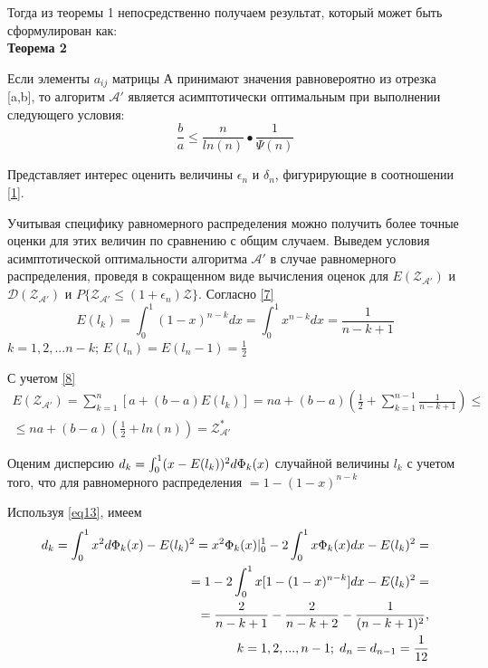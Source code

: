 \documentclass[a4paper, 14pt]{extarticle}
\numberwithin{equation}{section}
\begin{document}
Тогда из теоремы 1 непосредственно получаем результат, который может быть сформулирован как:\\

\textbf{Теорема 2}

Если элементы $a_{ij}$ матрицы А принимают значения равновероятно из отрезка [a,b], то алгоритм $\mathcal{A'}$ является асимптотически оптимальным при выполнении следующего условия:
\begin{equation}
\frac{b}{a} \leq \frac{n}{ln(n)}•\frac{1}{\Psi(n)}
\end{equation}

Представляет интерес оценить величины $\epsilon_n$ и $\delta_n$, фигурирующие в соотношении \eqref{1}.

Учитывая специфику равномерного распределения можно получить более точные оценки для этих величин по сравнению с общим случаем. Выведем условия асимптотической оптимальности алгоритма $\mathcal{A'}$ в случае равномерного распределения, проведя в сокращенном виде вычисления оценок для $E(\mathcal{Z_{A'}})$ и $\mathcal{D(Z_{A'})}$ и $P \{ \mathcal{Z_{A'}} \leq (1+\epsilon_n)\mathcal{Z} \}$. Согласно \eqref{7}
\begin{equation}\label{eq13} 
E(l_k) = \int_0^1 (1-x)^{n-k}dx = \int_0^1 x^{n-k}dx = \frac{1}{n-k+1}
\end{equation}
$k=1,2,...n-k$;   $ E(l_n) = E(l_n-1) = \frac{1}{2}$

С учетом \eqref{8}
\begin{equation}
\begin{aligned}
E(\mathcal{Z_{A'}}) = \sum_{k=1}^{n} [a+(b-a)E(l_k)] = na +(b-a)(\frac{1}{2}+\sum_{k=1}^{n-1} \frac{1}{n-k+1}) \leq \\
\leq na+(b-a)(\frac{1}{2} + ln(n)) = \mathcal{Z^*_{A'}}
\end{aligned}
\end{equation}

Оценим дисперсию $d_k=\int_0^1 (x-E(l_k))^2 d\text{$\Phi_k(x)$}$ случайной величины $l_k$ с учетом того, что для равномерного распределения \chanceLklesserX $ = 1-(1-x)^{n-k}$

Используя \eqref{eq13}, имеем
\begin{equation}
\begin{aligned}
d_k = \int_0^1 x^2 d \text{$\Phi_k(x)$}-E(l_k)^2=x^2 \text{$\Phi_k(x)$} 	
|_0^1 - 2 \int_0^1 x \text{$\Phi_k(x)$}dx - E(l_k)^2=\\
= 1-2\int_0^1 x[1-(1-x)^{n-k}]dx-E(l_k)^2 =\\
= \frac{2}{n-k+1} - \frac{2}{n-k+2} - \frac{1}{(n-k+1)^2}, \\ 
\; k=1,2,...,n-1; \; d_n = d_{n-1} = \frac{1}{12}
\end{aligned}
\end{equation}
\end{document}
